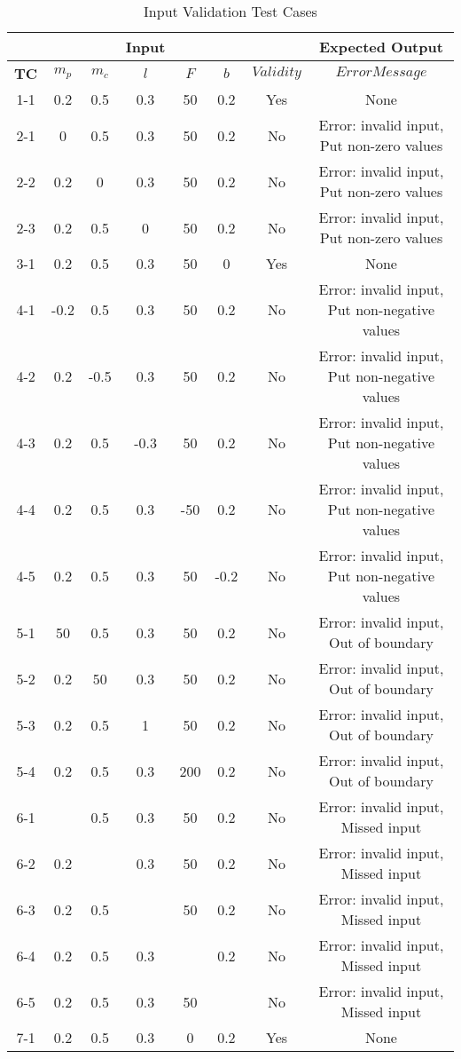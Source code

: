 \documentclass[12pt, titlepage]{article}
\begin{document}
\begin{table}[h!]
\centering
\caption{Input Validation Test Cases} \label{tbl_inputValidation}
\vspace*{2mm}
 \begin{tabular}{|c|c c c c c| c c|} 
 \hline
   & &&\textbf{Input}&& &  &\textbf{Expected Output} \\ \hline
\textbf{TC} &   $m_p$ & $m_c$ & $l$ & $F$ & $b$  &   $Validity$   &   $Error Message$ \\ \hline
1-1 &0.2 & 0.5& 0.3& 50& 0.2 & Yes & None\\
 \hline
2-1 &0 & 0.5& 0.3& 50& 0.2 & No & Error: invalid input, Put non-zero values  \\
 \hline
2-2 &0.2 & 0& 0.3& 50& 0.2& No & Error: invalid input, Put non-zero values \\
 \hline
2-3 &0.2 & 0.5& 0& 50& 0.2 &  No & Error: invalid input, Put non-zero values \\
 \hline
3-1 &0.2 & 0.5& 0.3& 50& 0 & Yes & None\\
 \hline
 4-1 &-0.2 & 0.5& 0.3& 50& 0.2&  No & Error: invalid input, Put non-negative values\\
 \hline
 4-2 &0.2 & -0.5& 0.3& 50& 0.2&   No & Error: invalid input, Put non-negative values\\
 \hline
 4-3 &0.2 & 0.5& -0.3& 50& 0.2&   No & Error: invalid input, Put non-negative values\\
 \hline
 4-4 &0.2 & 0.5& 0.3& -50& 0.2 &   No & Error: invalid input, Put non-negative values\\
 \hline
 4-5 &0.2 & 0.5& 0.3& 50& -0.2 &   No & Error: invalid input, Put non-negative values\\
 \hline
 5-1 & 50& 0.5& 0.3& 50& 0.2 & No & Error: invalid input, Out of boundary \\
 \hline
5-2 & 0.2& 50& 0.3& 50& 0.2 & No & Error: invalid input, Out of boundary \\
 \hline
5-3 & 0.2& 0.5& 1& 50& 0.2& No & Error: invalid input, Out of boundary \\
 \hline
5-4 & 0.2& 0.5& 0.3& 200& 0.2 & No & Error: invalid input, Out of boundary \\
 \hline
6-1 & & 0.5& 0.3& 50& 0.2 & No & Error: invalid input, Missed input \\
  \hline
6-2 &0.2 & &0.3 & 50& 0.2 & No & Error: invalid input, Missed input \\  \hline
 6-3 & 0.2& 0.5& & 50& 0.2 & No & Error: invalid input, Missed input \\
  \hline
  6-4 & 0.2& 0.5& 0.3& & 0.2 & No & Error: invalid input, Missed input \\
  \hline
   6-5 & 0.2& 0.5& 0.3& 50&  & No & Error: invalid input, Missed input \\
  \hline
 7-1 &0.2 & 0.5& 0.3& 0& 0.2& Yes & None\\
 \hline
\end{tabular}

\end{table}		
\end{document}
